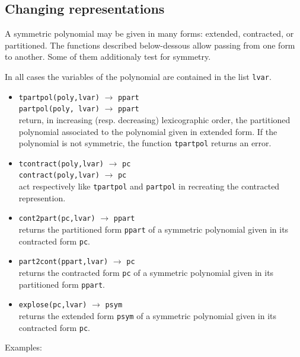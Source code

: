 \documentclass[11pt]{article}
\begin{document}
\subsection{Changing representations}

A symmetric polynomial may be given in many forms: extended, contracted, or
partitioned. The functions described below-dessous allow passing from one form
to another. Some of them additionaly test for symmetry.

In all cases the variables of the polynomial are contained in the list
\texttt{lvar}.
\begin{itemize}
   \item \texttt{tpartpol(poly,lvar)} 
   $\longrightarrow$ \texttt{ppart} \\ 
   \texttt{partpol(poly, lvar)} 
   $\longrightarrow$ \texttt{ppart} \\ 
   return, in increasing (resp. decreasing) lexicographic order, the partitioned
   polynomial associated to the polynomial given in extended form.  If the
   polynomial is not symmetric, the function \texttt{tpartpol} returns an error.
  \item \texttt{tcontract(poly,lvar)} 
    $\longrightarrow$ \texttt{pc} \\ \texttt{contract(poly,lvar)}
     $\longrightarrow$ \texttt{pc} \\ act respectively
    like \texttt{tpartpol} and \texttt{partpol} in recreating the contracted
    represention.
  \item \texttt{cont2part(pc,lvar)} 
    $\longrightarrow$ \texttt{ppart} \\ returns the partitioned form
    \texttt{ppart} of a symmetric polynomial given in its contracted form
    \texttt{pc}.
  \item \texttt{part2cont(ppart,lvar)} 
    $\longrightarrow$ \texttt{pc} \\ returns the contracted form \texttt{pc} of a
    symmetric polynomial given in its partitioned form \texttt{ppart}.
  \item \texttt{explose(pc,lvar)}  $\longrightarrow$
    \texttt{psym} \\ returns the extended form \texttt{psym} of a symmetric
    polynomial given in its contracted form \texttt{pc}.
\end{itemize}
Examples:
\small
\end{document}
